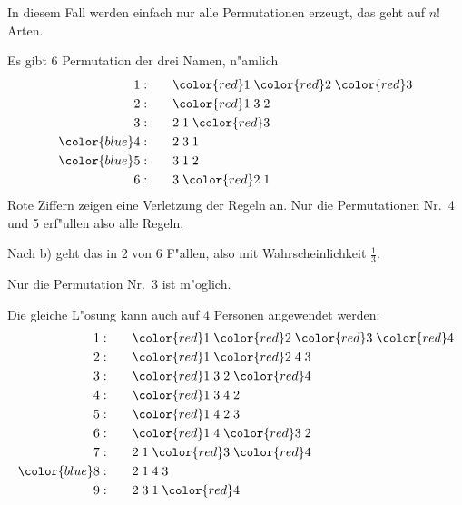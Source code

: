 \begin{loesung}
\begin{teilaufgaben}
\item 
In diesem Fall werden einfach nur alle Permutationen erzeugt,
das geht auf $n!$ Arten.
\item
Es gibt 6 Permutation der drei Namen,  n"amlich
\begin{align*}
             1: \qquad&{\color{red}1}\;{\color{red}2}\;{\color{red}3}\\
             2: \qquad&{\color{red}1}\;            3 \;            2 \\
             3: \qquad&            2 \;            1 \;{\color{red}3}\\
{\color{blue}4:}\qquad&            2 \;            3 \;            1 \\
{\color{blue}5:}\qquad&            3 \;            1 \;            2 \\
             6: \qquad&            3 \;{\color{red}2}\;            1 
\end{align*}
Rote Ziffern zeigen eine Verletzung der Regeln an.
Nur die Permutationen Nr.~{\color{blue}4} und {\color{blue}5}
erf"ullen also alle Regeln.
\item
Nach b) geht das in 2 von 6 F"allen, also mit Wahrscheinlichkeit $\frac13$.
\item
Nur die Permutation Nr.~3 ist m"oglich.
\item
Die gleiche L"osung kann auch auf 4 Personen angewendet werden:
\begin{align*}
 1: \qquad&{\color{red}1}\;{\color{red}2}\;{\color{red}3}\;{\color{red}4}\\
 2: \qquad&{\color{red}1}\;{\color{red}2}\;            4 \;            3 \\
 3: \qquad&{\color{red}1}\;            3 \;            2 \;{\color{red}4}\\
 4: \qquad&{\color{red}1}\;            3 \;            4 \;            2 \\
 5: \qquad&{\color{red}1}\;            4 \;            2 \;            3 \\
 6: \qquad&{\color{red}1}\;            4 \;{\color{red}3}\;            2 \\
%
 7: \qquad&            2 \;            1 \;{\color{red}3}\;{\color{red}4}\\
{\color{blue}
 8:}\qquad&            2 \;            1 \;            4 \;            3 \\
 9: \qquad&            2 \;            3 \;            1 \;{\color{red}4}\\

\end{align*}
\end{teilaufgaben}
\end{loesung}
